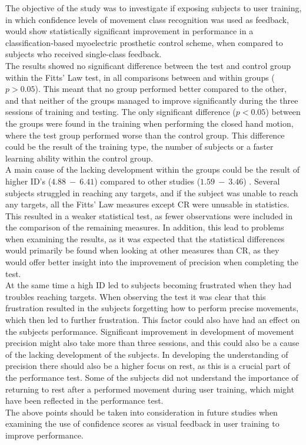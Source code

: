 The objective of the study was to investigate if exposing subjects to user training, in which confidence levels of movement class recognition was used as feedback, would show statistically significant improvement in performance in a classification-based myoelectric prosthetic control scheme, when compared to subjects who received single-class feedback. \\
The results showed no significant difference between the test and control group within the Fitts' Law test, in all comparisons between and within groups ($p > 0.05$). This meant that no group performed better compared to the other, and that neither of the groups managed to improve significantly during the three sessions of training and testing. The only significant difference ($p < 0.05$) between the groups were found in the training when performing the closed hand motion, where the test group performed worse than the control group. This difference could be the result of the training type, the number of subjects or a faster learning ability within the control group.\\
A main cause of the lacking development within the groups could be the result of higher ID's ($4.88~-~6.41$) compared to other studies ($1.59~-~3.46$) \cite{Scheme2013, Scheme2013a}. Several subjects struggled in reaching any targets, and if the subject was unable to reach any targets, all the Fitts' Law measures except CR were unusable in statistics. This resulted in a weaker statistical test, as fewer observations were included in the comparison of the remaining measures. In addition, this lead to problems when examining the results, as it was expected that the statistical differences would primarily be found when looking at other measures than CR, as they would offer better insight into the improvement of precision when completing the test.  \\
At the same time a high ID led to subjects becoming frustrated when they had troubles reaching targets. When observing the test it was clear that this frustration resulted in the subjects forgetting how to perform precise movements, which then led to further frustration. This factor could also have had an effect on the subjects performance. Significant improvement in development of movement precision might also take more than three sessions, and this could also be a cause of the lacking development of the subjects. In developing the understanding of precision there should also be a higher focus on rest, as this is a crucial part of the performance test. Some of the subjects did not understand the importance of returning to rest after a performed movement during user training, which might have been reflected in the performance test.\\
The above points should be taken into consideration in future studies when examining the use of confidence scores as visual feedback in user training to improve performance.

